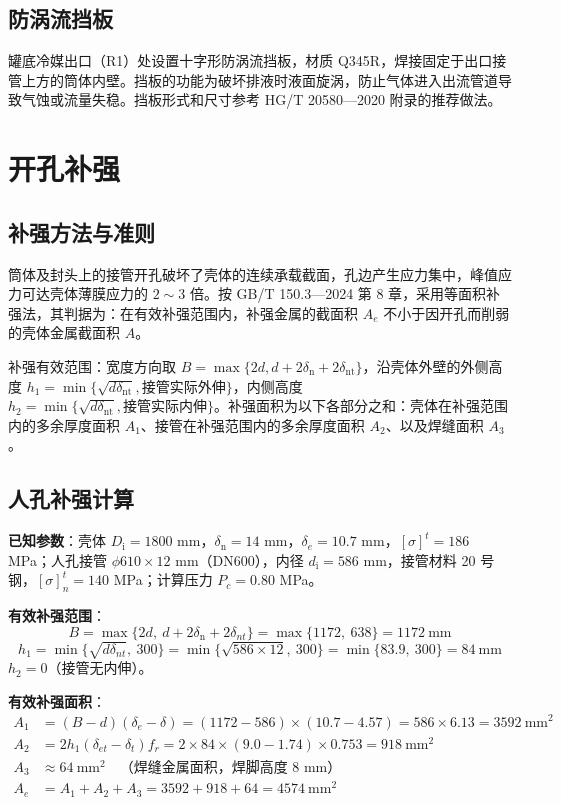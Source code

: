 \subsection{防涡流挡板}

罐底冷媒出口（R1）处设置十字形防涡流挡板，材质 Q345R，焊接固定于出口接管上方的筒体内壁。挡板的功能为破坏排液时液面旋涡，防止气体进入出流管道导致气蚀或流量失稳。挡板形式和尺寸参考 HG/T 20580—2020 附录的推荐做法\cite{hgt20580-2020}。

\section{开孔补强}

\label{sec:opening}

\subsection{补强方法与准则}

筒体及封头上的接管开孔破坏了壳体的连续承载截面，孔边产生应力集中，峰值应力可达壳体薄膜应力的 $2\sim3$ 倍。按 GB/T 150.3—2024 第 8 章\cite{gbt150-2024}，采用等面积补强法，其判据为：在有效补强范围内，补强金属的截面积 $A_e$ 不小于因开孔而削弱的壳体金属截面积 $A$。

补强有效范围：宽度方向取 $B = \max\{2d, d + 2\delta_{\mathrm{n}} + 2\delta_{\mathrm{nt}}\}$，沿壳体外壁的外侧高度 $h_1 = \min\{\sqrt{d\delta_{\mathrm{nt}}}, \text{接管实际外伸}\}$，内侧高度 $h_2 = \min\{\sqrt{d\delta_{\mathrm{nt}}}, \text{接管实际内伸}\}$。补强面积为以下各部分之和：壳体在补强范围内的多余厚度面积 $A_1$、接管在补强范围内的多余厚度面积 $A_2$、以及焊缝面积 $A_3$。

\subsection{人孔补强计算}

\textbf{已知参数}：壳体 $D_{\mathrm{i}} = 1800$ mm，$\delta_{\mathrm{n}} = 14$ mm，$\delta_e = 10.7$ mm，$[\sigma]^t = 186$ MPa；人孔接管 $\phi 610 \times 12$ mm（DN600），内径 $d_{\mathrm{i}} = 586$ mm，接管材料 20 号钢，$[\sigma]^t_n = 140$ MPa；计算压力 $P_c = 0.80$ MPa。


\textbf{有效补强范围}：
\[
B = \max\{2d,\ d + 2\delta_{\mathrm{n}} + 2\delta_{nt}\} = \max\{1172,\ 638\} = 1172\ \text{mm}
\]
\[
h_1 = \min\{\sqrt{d\delta_{nt}},\ 300\} = \min\{\sqrt{586 \times 12},\ 300\} = \min\{83.9,\ 300\} = 84\ \text{mm}
\]
$h_2 = 0$（接管无内伸）。

\textbf{有效补强面积}：
\begin{align}
A_1 &= (B - d)(\delta_e - \delta) = (1172 - 586) \times (10.7 - 4.57) = 586 \times 6.13 = 3592\ \text{mm}^2 \\
A_2 &= 2h_1(\delta_{et} - \delta_t)f_r = 2 \times 84 \times (9.0 - 1.74) \times 0.753 = 918\ \text{mm}^2 \\
A_3 &\approx 64\ \text{mm}^2 \quad \text{（焊缝金属面积，焊脚高度 8 mm）} \\
A_e &= A_1 + A_2 + A_3 = 3592 + 918 + 64 = 4574\ \text{mm}^2
\end{align}


